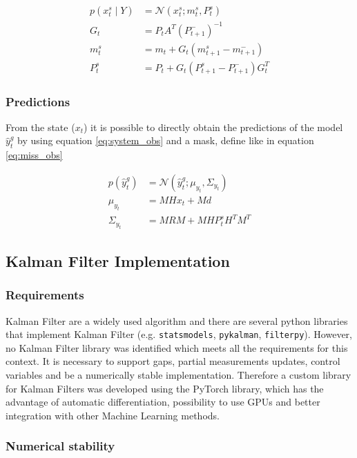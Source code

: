 \documentclass{article}
\newcommand{\norm}[3]{\mathcal{N}\left(#1; #2, #3\right)} %
\let\Oldsubsection\subsection
\renewcommand{\subsection}{\FloatBarrier\Oldsubsection}
\begin{document}
\begin{align}
    p(x_t^s \mid Y) &= \norm{x_t^s}{m_t^s}{P_t^s} \label{eq:smoother}\\
    G_t &= P_tA^T(P_{t+1}^-)^{-1} \label{eq:smoother:gain}\\
    m_t^s &= m_t + G_t(m_{t+1}^s - m_{t+1}^-) \label{eq:smoother:mean}\\
    P_t^s &= P_t + G_t(P_{t+1}^s - P_{t+1}^-)G_t^T \label{eq:smoother:cov}
\end{align}

\subsubsection{Predictions}

From the state ($x_t$) it is possible to directly obtain the predictions of the model $\hat{y}^g_t$ by using equation \ref{eq:system_obs} and a mask, define like in equation \ref{eq:miss_obs}

\begin{align}\label{eq:filter_predictions}
    p(\hat{y}^g_t) &= \norm{\hat{y}^g_t}{\mu_{y_t}}{\Sigma_{y_t}} \\
    \mu_{y_t} &= MHx_t + Md \\
    \Sigma_{y_t} &= MRM + MHP^s_tH^TM^T
\end{align}


\subsection{Kalman Filter Implementation}

\subsubsection{Requirements}

Kalman Filter are a widely used algorithm and there are several python libraries that implement Kalman Filter (e.g. \verb|statsmodels|, \verb|pykalman|, \verb|filterpy|). However, no  Kalman Filter library was identified which meets all the requirements for this context. It is necessary to support gaps, partial measurements updates, control variables and be a numerically stable implementation.
Therefore a custom library for Kalman Filters was developed using the PyTorch library, which has the advantage of automatic differentiation, possibility to use GPUs and better integration with other Machine Learning methods.

\subsubsection{Numerical stability}
\end{document}
